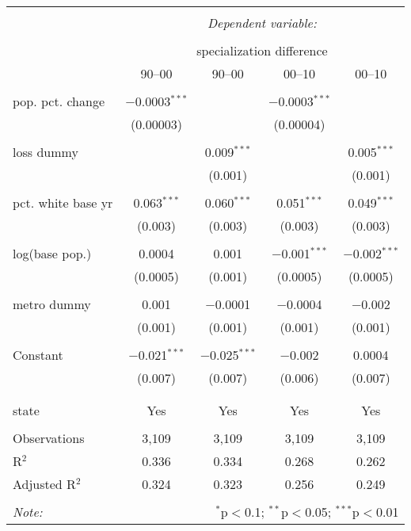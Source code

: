 \documentclass{standalone}
\begin{document}
\begin{tabular}{@{\extracolsep{5pt}}lcccc} 
\\[-1.8ex]\hline 
\hline \\[-1.8ex] 
 & \multicolumn{4}{c}{\textit{Dependent variable:}} \\ 
\cline{2-5} 
\\[-1.8ex] & \multicolumn{4}{c}{specialization difference} \\ 
 & 90--00 & 90--00 & 00--10 & 00--10 \\ 
\hline \\[-1.8ex] 
 pop. pct. change & $-$0.0003$^{***}$ &  & $-$0.0003$^{***}$ &  \\ 
  & (0.00003) &  & (0.00004) &  \\ 
  & & & & \\ 
 loss dummy &  & 0.009$^{***}$ &  & 0.005$^{***}$ \\ 
  &  & (0.001) &  & (0.001) \\ 
  & & & & \\ 
 pct. white base yr & 0.063$^{***}$ & 0.060$^{***}$ & 0.051$^{***}$ & 0.049$^{***}$ \\ 
  & (0.003) & (0.003) & (0.003) & (0.003) \\ 
  & & & & \\ 
 log(base pop.) & 0.0004 & 0.001 & $-$0.001$^{***}$ & $-$0.002$^{***}$ \\ 
  & (0.0005) & (0.001) & (0.0005) & (0.0005) \\ 
  & & & & \\ 
 metro dummy & 0.001 & $-$0.0001 & $-$0.0004 & $-$0.002 \\ 
  & (0.001) & (0.001) & (0.001) & (0.001) \\ 
  & & & & \\ 
 Constant & $-$0.021$^{***}$ & $-$0.025$^{***}$ & $-$0.002 & 0.0004 \\ 
  & (0.007) & (0.007) & (0.006) & (0.007) \\ 
  & & & & \\ 
\hline \\[-1.8ex] 
state & Yes & Yes & Yes & Yes \\ 
\hline \\[-1.8ex] 
Observations & 3,109 & 3,109 & 3,109 & 3,109 \\ 
R$^{2}$ & 0.336 & 0.334 & 0.268 & 0.262 \\ 
Adjusted R$^{2}$ & 0.324 & 0.323 & 0.256 & 0.249 \\ 
\hline 
\hline \\[-1.8ex] 
\textit{Note:}  & \multicolumn{4}{r}{$^{*}$p$<$0.1; $^{**}$p$<$0.05; $^{***}$p$<$0.01} \\ 
\end{tabular} 
\end{document}
